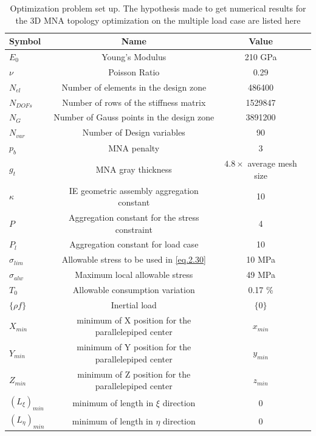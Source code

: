     \begin{table}[h]
            \caption{\label{tab:table3.5} Optimization problem set up. The hypothesis made to get numerical results for the 3D MNA topology optimization on the multiple load case are listed here}
             \centering
             \begin{tabular}{lccc}
             \hline
              Symbol& Name& Value\\\hline
             $E_0$ & Young's Modulus & 210 GPa\\
             $\nu$ & Poisson Ratio& 0.29&\\ $N_{el}$ & Number of elements in the design zone & 486400 \\
             $N_{DOFs}$ & Number of rows of the stiffness matrix & 1529847\\
             $N_G$ & Number of Gauss points in the design zone & 3891200\\
             $N_{var}$ & Number of Design variables & 90\\
    		$p_b$ & MNA penalty & 3\\
    		$g_t$ & MNA gray thickness & $4.8 \times$ average mesh size\\
    		$\kappa$ & IE geometric assembly aggregation constant & 10\\
    		$P$ & Aggregation constant for the stress constraint & 4\\  
    		$P_l$ & Aggregation constant for load case& 10\\ 
    		$\sigma_{lim}$ & Allowable stress to be used in \eqref{eq.2.30} & 10 MPa\\
    		$\sigma_{alw}$ & Maximum local allowable stress & 49 MPa\\
    		$T_0$ & Allowable consumption variation & 0.17 \% \\
    		$\lbrace\rho f \rbrace$ & Inertial load & $\lbrace 0 \rbrace$ \\
    		$X_{min}$ & minimum of X position for the parallelepiped center & $x_{min}$\\
    		$Y_{min}$ & minimum of Y position for the parallelepiped center & $y_{min}$\\
    		$Z_{min}$ & minimum of Z position for the parallelepiped center & $z_{min}$\\
    		$(L_\xi)_{min}$ & minimum of length in $\xi$ direction & $0$\\
    		$(L_\eta)_{min}$ & minimum of length in $\eta$ direction & $0$\\

\end{tabular}
\end{table}
